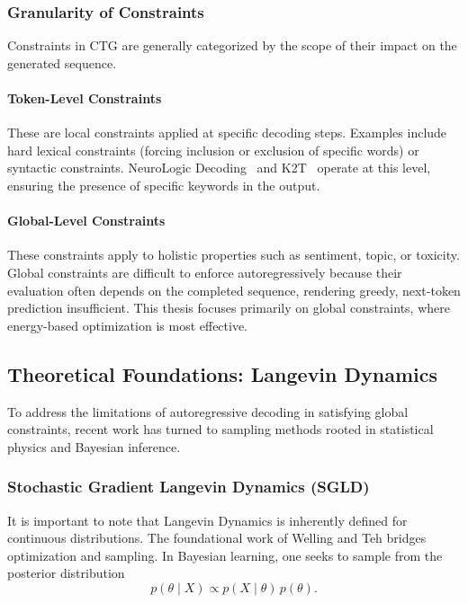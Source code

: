 \documentclass[11pt]{article}
\begin{document}
\subsubsection{Granularity of Constraints}

Constraints in CTG are generally categorized by the scope of their impact on the generated sequence.

\paragraph{Token-Level Constraints}
These are local constraints applied at specific decoding steps. Examples include hard lexical constraints (forcing inclusion or exclusion of specific words) or syntactic constraints. NeuroLogic Decoding~\cite{lu-etal-2021-neurologic} and K2T~\cite{pascual-etal-2021-plug-play} operate at this level, ensuring the presence of specific keywords in the output.

\paragraph{Global-Level Constraints}
These constraints apply to holistic properties such as sentiment, topic, or toxicity. Global constraints are difficult to enforce autoregressively because their evaluation often depends on the completed sequence, rendering greedy, next-token prediction insufficient. This thesis focuses primarily on global constraints, where energy-based optimization is most effective.

\subsection{Theoretical Foundations: Langevin Dynamics}

To address the limitations of autoregressive decoding in satisfying global constraints, recent work has turned to sampling methods rooted in statistical physics and Bayesian inference.

\subsubsection{Stochastic Gradient Langevin Dynamics (SGLD)}

It is important to note that Langevin Dynamics is inherently defined for continuous distributions. The foundational work of Welling and Teh \cite{10.5555/3104482.3104568} bridges optimization and sampling. In Bayesian learning, one seeks to sample from the posterior distribution
\begin{equation}
p(\theta \mid X) \propto p(X \mid \theta)\, p(\theta).
\end{equation}
\end{document}
